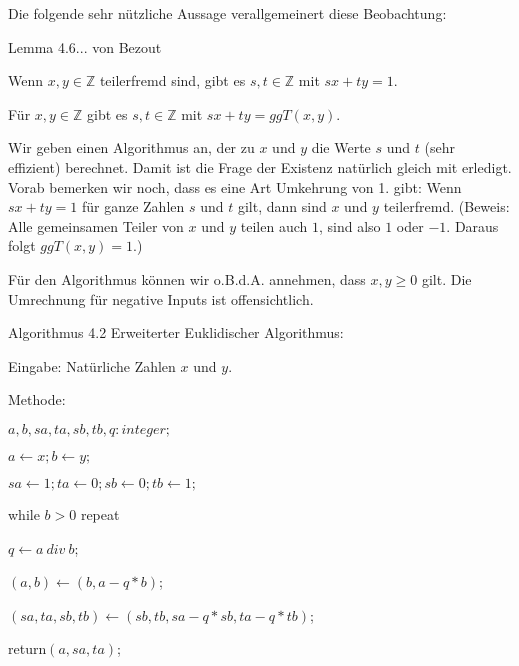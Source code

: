 \documentclass[a4paper]{article}
\begin{document}
\begin{multicols}{3}
    Die folgende sehr nützliche Aussage verallgemeinert diese Beobachtung:

    Lemma 4.6... von Bezout
    \begin{enumerate*}
        \item Wenn $x,y\in\mathbb{Z}$ teilerfremd sind, gibt es $s,t\in\mathbb{Z}$ mit $sx+ty= 1$.
        \item Für $x,y\in\mathbb{Z}$ gibt es $s,t\in\mathbb{Z}$ mit $sx+ty= ggT(x,y)$.
    \end{enumerate*}

    Wir geben einen Algorithmus an, der zu $x$ und $y$ die Werte $s$ und $t$ (sehr effizient) berechnet. Damit ist die Frage der Existenz natürlich gleich mit erledigt. Vorab bemerken wir noch, dass es eine Art Umkehrung von 1. gibt: Wenn $sx+ty= 1$ für ganze Zahlen $s$ und $t$ gilt, dann sind $x$ und $y$ teilerfremd. (Beweis: Alle gemeinsamen Teiler von $x$ und $y$ teilen auch $1$, sind also $1$ oder $-1$. Daraus folgt $ggT(x,y) = 1$.)

    Für den Algorithmus können wir o.B.d.A. annehmen, dass $x,y\geq 0$ gilt. Die Umrechnung für negative Inputs ist offensichtlich.

    Algorithmus 4.2 Erweiterter Euklidischer Algorithmus:
    \begin{itemize*}
        \item Eingabe: Natürliche Zahlen $x$ und $y$.
        \item Methode:
        \begin{enumerate*}
            \item $a,b,sa,ta,sb,tb,q:integer;$
            \item $a\leftarrow x; b\leftarrow y;$
            \item $sa\leftarrow 1; ta\leftarrow 0; sb\leftarrow 0; tb\leftarrow 1;$
            \item while $b> 0$ repeat
            \begin{enumerate*}
                \item $q\leftarrow a\ div\ b$;
                \item $(a,b)\leftarrow (b,a-q*b)$;
                \item $(sa,ta,sb,tb)\leftarrow (sb,tb,sa-q*sb,ta-q*tb)$;
            \end{enumerate*}
            \item return$(a,sa,ta)$;
        \end{enumerate*}
    \end{itemize*}


\end{multicols}
\end{document}
